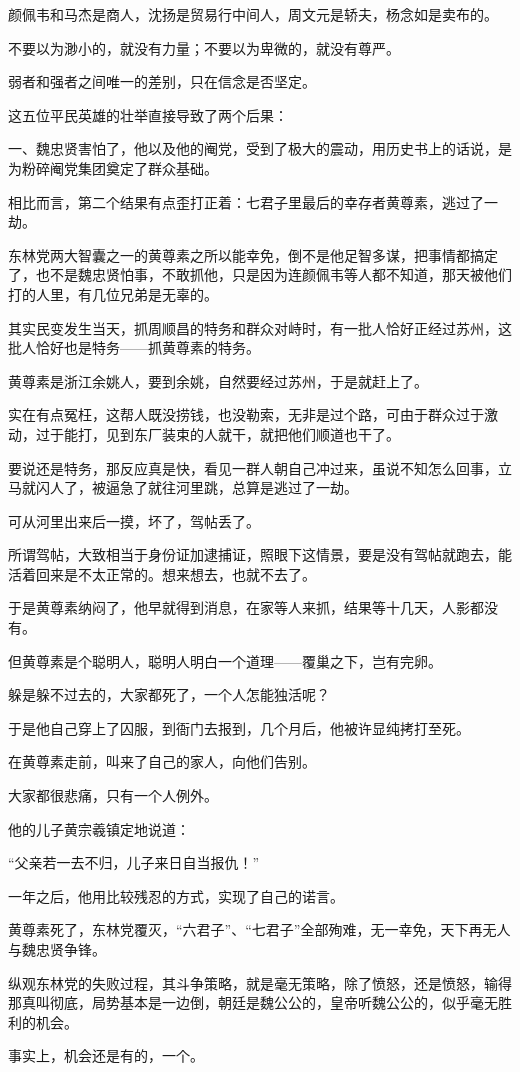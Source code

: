 \begin{multicols}{\theparacolNo}
颜佩韦和马杰是商人，沈扬是贸易行中间人，周文元是轿夫，杨念如是卖布的。

不要以为渺小的，就没有力量；不要以为卑微的，就没有尊严。

弱者和强者之间唯一的差别，只在信念是否坚定。

这五位平民英雄的壮举直接导致了两个后果：

一、魏忠贤害怕了，他以及他的阉党，受到了极大的震动，用历史书上的话说，是为粉碎阉党集团奠定了群众基础。

相比而言，第二个结果有点歪打正着：七君子里最后的幸存者黄尊素，逃过了一劫。

东林党两大智囊之一的黄尊素之所以能幸免，倒不是他足智多谋，把事情都搞定了，也不是魏忠贤怕事，不敢抓他，只是因为连颜佩韦等人都不知道，那天被他们打的人里，有几位兄弟是无辜的。

其实民变发生当天，抓周顺昌的特务和群众对峙时，有一批人恰好正经过苏州，这批人恰好也是特务——抓黄尊素的特务。

黄尊素是浙江余姚人，要到余姚，自然要经过苏州，于是就赶上了。

实在有点冤枉，这帮人既没捞钱，也没勒索，无非是过个路，可由于群众过于激动，过于能打，见到东厂装束的人就干，就把他们顺道也干了。

要说还是特务，那反应真是快，看见一群人朝自己冲过来，虽说不知怎么回事，立马就闪人了，被逼急了就往河里跳，总算是逃过了一劫。

可从河里出来后一摸，坏了，驾帖丢了。

所谓驾帖，大致相当于身份证加逮捕证，照眼下这情景，要是没有驾帖就跑去，能活着回来是不太正常的。想来想去，也就不去了。

于是黄尊素纳闷了，他早就得到消息，在家等人来抓，结果等十几天，人影都没有。

但黄尊素是个聪明人，聪明人明白一个道理——覆巢之下，岂有完卵。

躲是躲不过去的，大家都死了，一个人怎能独活呢？

于是他自己穿上了囚服，到衙门去报到，几个月后，他被许显纯拷打至死。

在黄尊素走前，叫来了自己的家人，向他们告别。

大家都很悲痛，只有一个人例外。

他的儿子黄宗羲镇定地说道：

“父亲若一去不归，儿子来日自当报仇！”

一年之后，他用比较残忍的方式，实现了自己的诺言。

黄尊素死了，东林党覆灭，“六君子”、“七君子”全部殉难，无一幸免，天下再无人与魏忠贤争锋。

纵观东林党的失败过程，其斗争策略，就是毫无策略，除了愤怒，还是愤怒，输得那真叫彻底，局势基本是一边倒，朝廷是魏公公的，皇帝听魏公公的，似乎毫无胜利的机会。

事实上，机会还是有的，一个。
\ifnum{}
	\end{multicols}
\fi
\newpage
